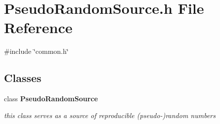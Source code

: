 \section{Pseudo\+Random\+Source.\+h File Reference}
\label{PseudoRandomSource_8h}
{\ttfamily \#include \char`\"{}common.\+h\char`\"{}}\newline
\subsection*{Classes}
\begin{DoxyCompactItemize}
\item 
class \textbf{ Pseudo\+Random\+Source}
\begin{DoxyCompactList}\small\item\em this class serves as a source of reproducible (pseudo-\/)random numbers \end{DoxyCompactList}\end{DoxyCompactItemize}
